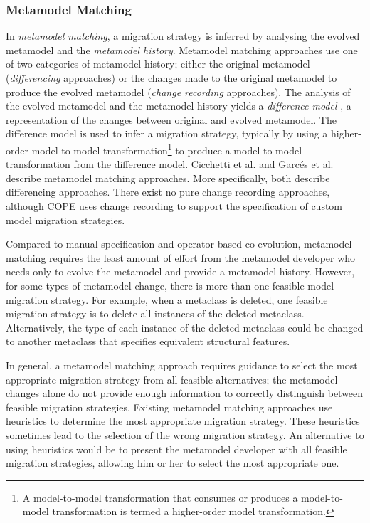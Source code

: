\subsubsection{Metamodel Matching}
\label{subsec:metamodel_matching}
In \emph{metamodel matching}, a migration strategy is inferred by analysing the evolved metamodel and the \emph{metamodel history}. Metamodel matching approaches use one of two categories of metamodel history; either the original metamodel (\emph{differencing} approaches) or the changes made to the original metamodel to produce the evolved metamodel (\emph{change recording} approaches). The analysis of the evolved metamodel and the metamodel history yields a \emph{difference model} \cite{cicchetti08automating}, a representation of the changes between original and evolved metamodel. The difference model is used to infer a migration strategy, typically by using a higher-order model-to-model transformation\footnote{A model-to-model transformation that consumes or produces a model-to-model transformation is termed a higher-order model transformation.} to produce a model-to-model transformation from the difference model. Cicchetti et al. \cite{cicchetti08automating} and Garc{\'e}s et al. \cite{garces09managing} describe metamodel matching approaches. More specifically, both describe differencing approaches. There exist no pure change recording approaches, although COPE \cite{herrmannsdoerfer09cope} uses change recording to support the specification of custom model migration strategies.

Compared to manual specification and operator-based co-evolution, metamodel matching requires the least amount of effort from the metamodel developer who needs only to evolve the metamodel and provide a metamodel history. However, for some types of metamodel change, there is more than one feasible model migration strategy. For example, when a metaclass is deleted, one feasible migration strategy is to delete all instances of the deleted metaclass. Alternatively, the type of each instance of the deleted metaclass could be changed to another metaclass that specifies equivalent structural features.

In general, a metamodel matching approach requires guidance to select the most appropriate migration strategy from all feasible alternatives; the metamodel changes alone do not provide enough information to correctly distinguish between feasible migration strategies. Existing metamodel matching approaches use heuristics to determine the most appropriate migration strategy. These heuristics sometimes lead to the selection of the wrong migration strategy. An alternative to using heuristics would be to present the metamodel developer with all feasible migration strategies, allowing him or her to select the most appropriate one.

